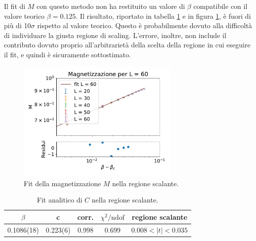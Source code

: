 \documentclass[a4paper,11pt]{article}
\newcommand{\chindof}{\chi^2 / \text{ndof}}
\begin{document}
	Il fit di $M$ con questo metodo non ha restituito un valore di $\beta$ compatibile con il valore teorico $\beta = 0.125$. Il risultato, riportato in tabella \ref{tab:M_fit} e in figura \ref{fig:M_fit}, è fuori di più di 10$\sigma$ rispetto al valore teorico. Questo è probabilmente dovuto alla difficoltà di individuare la giusta regione di scaling. L'errore, inoltre, non include il contributo dovuto proprio all'arbitrarietà della scelta della regione in cui eseguire il fit, e quindi è sicuramente sottostimato.
	
	\begin{figure}[htb]
        \centering
        \includegraphics[width=0.7\textwidth]{figure/m_fit.pdf}
        \caption{Fit della magnetizzazione $M$ nella regione scalante.}
        \label{fig:M_fit}
	\end{figure}
	
	\begin{table}[htb]
       \centering
        \begin{tabular}{c c c c c } \hline 
                $\beta$  & c    & corr. & $\chindof$ & regione scalante \\ \hline
                0.1086(18) & 0.223(6)   & 0.998   & 0.699 & $0.008 < |t| < 0.035$ \\ \hline
        \end{tabular}
        \caption{Fit analitico di $C$ nella regione scalante.}
        \label{tab:M_fit}
	\end{table}
\end{document}
